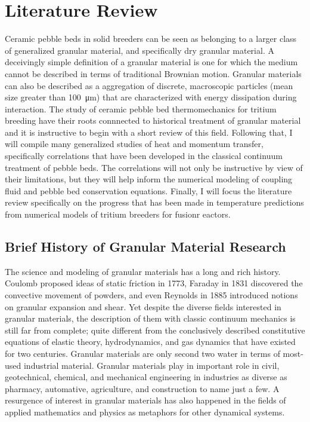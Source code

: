 \chapter{Literature Review}

Ceramic pebble beds in solid breeders can be seen as belonging to a larger class of generalized granular material, and specifically dry granular material. A deceivingly simple definition of a granular material is one for which the medium cannot be described in terms of traditional Brownian motion.\cite{duran2012sands} Granular materials can also be described as a aggregation of discrete, macroscopic particles (mean size greater than \SI{100}{\micro\meter}) that are characterized with energy dissipation during interaction. The study of ceramic pebble bed thermomechanics for tritium breeding have their roots connnected to historical treatment of granular material and it is instructive to begin with a short review of this field. Following that, I will compile many generalized studies of heat and momentum transfer, specifically correlations that have been developed in the classical continuum treatment of pebble beds. The correlations will not only be instructive by view of their limitations, but they will help inform the numerical modeling of coupling fluid and pebble bed conservation equations. Finally, I will focus the literature review specifically on the progress that has been made in temperature predictions from numerical models of tritium breeders for fusionr eactors.

\section{Brief History of Granular Material Research}
The science and modeling of granular materials has a long and rich history. Coulomb proposed ideas of static friction in 1773, Faraday in 1831 discovered the convective movement of powders, and even Reynolds in 1885 introduced notions on granular expansion and shear.\cite{Jaeger1996a} Yet despite the diverse fields interested in granular materials, the description of them with classic continuum mechanics is still far from complete; quite different from the conclusively described constitutive equations of elastic theory, hydrodynamics, and gas dynamics that have existed for two centuries.\cite{Sadovskaya2012} Granular materials are only second two water in terms of most-used industrial material. Granular materials play in important role in civil, geotechnical, chemical, and mechanical engineering in industries as diverse as pharmacy, automative, agriculture, and construction to name just a few.\cite{Hill,duran2012sands} A resurgence of interest in granular materials has also happened in the fields of applied mathematics and physics as metaphors for other dynamical systems.\cite{Jaeger1996a}

